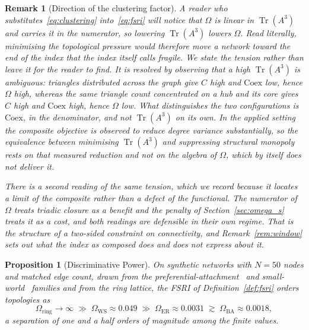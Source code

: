 \documentclass[11pt,a4paper]{article}
\newtheorem{proposition}{Proposition}
\newtheorem{remark}{Remark}
\begin{document}
\begin{remark}[Direction of the clustering factor]
\label{rem:direction}
A reader who substitutes~\eqref{eq:clustering} into~\eqref{eq:fsri} will
notice that $\Omega$ is linear in $\operatorname{Tr}(A^3)$ and carries it
in the \emph{numerator}, so lowering $\operatorname{Tr}(A^3)$ lowers
$\Omega$. Read literally, minimising the topological pressure would
therefore move a network toward the end of the index that the index
itself calls fragile. We state the tension rather than leave it for the
reader to find. It is resolved by observing that a high
$\operatorname{Tr}(A^3)$ is ambiguous: triangles distributed across the
graph give $C$ high and $\mathrm{Coex}$ low, hence $\Omega$ high,
whereas the same triangle count concentrated on a hub and its core gives
$C$ high and $\mathrm{Coex}$ high, hence $\Omega$ low. What
distinguishes the two configurations is $\mathrm{Coex}$, in the
denominator, and not $\operatorname{Tr}(A^3)$ on its own. In the applied
setting the composite objective is observed to reduce degree variance
substantially, so the equivalence between minimising
$\operatorname{Tr}(A^3)$ and suppressing structural monopoly rests on
that \emph{measured} reduction and not on the algebra of $\Omega$, which
by itself does not deliver it.

There is a second reading of the same tension, which we record because it
locates a limit of the composite rather than a defect of the functional. The
numerator of $\Omega$ treats triadic closure as a benefit and the penalty of
Section~\ref{sec:omega_s} treats it as a cost, and both readings are defensible
in their own regime. That is the structure of a two-sided constraint on
connectivity, and Remark~\ref{rem:window} sets out what the index as composed
does and does not express about it.
\end{remark}

\begin{proposition}[Discriminative Power]
\label{prop:discriminative}
On synthetic networks with $N = 50$ nodes and matched edge count, drawn from
the preferential-attachment~\cite{barabasi1999} and small-world~\cite{watts1998}
families and from the ring lattice, the FSRI
of Definition~\ref{def:fsri} orders topologies as
\[
\Omega_{\text{ring}} \to \infty \;\gg\; \Omega_{\text{WS}} \approx 0.049
\;\gg\; \Omega_{\text{ER}} \approx 0.0031 \;\gtrsim\;
\Omega_{\text{BA}} \approx 0.0018,
\]
a separation of one and a half orders of magnitude among the finite values.
\end{proposition}
\end{document}
